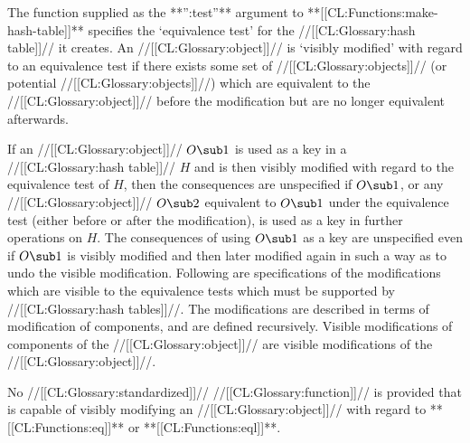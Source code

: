 
\endsubsection%

 


The function supplied as the **'':test''** argument to **[[CL:Functions:make-hash-table]]** specifies the `equivalence test' for the //[[CL:Glossary:hash table]]// it creates.
  An //[[CL:Glossary:object]]// is `visibly modified' with regard to an equivalence test if there exists some set of //[[CL:Glossary:objects]]// (or potential //[[CL:Glossary:objects]]//) which are equivalent to the //[[CL:Glossary:object]]// before the modification but are no longer equivalent afterwards.

If an //[[CL:Glossary:object]]// $O\sub 1$ is used as a key in a //[[CL:Glossary:hash table]]// $H$ and is then visibly modified with regard to the equivalence test of $H$, then the consequences are unspecified if $O\sub 1$, or any //[[CL:Glossary:object]]// $O\sub 2$ equivalent to $O\sub 1$ under the equivalence test (either before or after the modification), is used as a key in further operations on $H$. The consequences of using $O\sub 1$ as a key are unspecified  even if $O\sub 1$ is visibly modified  and then later modified again in such a way as  to undo the visible modification.
  Following are specifications of the modifications which are visible to the equivalence tests which must be supported by //[[CL:Glossary:hash tables]]//.  The modifications are described in terms of modification of components, and are defined recursively.  Visible modifications of components of the //[[CL:Glossary:object]]// are  visible modifications of the //[[CL:Glossary:object]]//.

  

No //[[CL:Glossary:standardized]]// //[[CL:Glossary:function]]// is provided that is capable of visibly modifying an //[[CL:Glossary:object]]// with regard to **[[CL:Functions:eq]]** or **[[CL:Functions:eql]]**.

\endsubsubsection%

 

